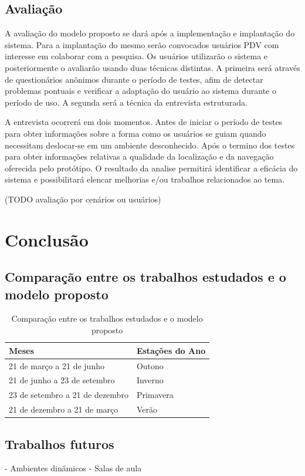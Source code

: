 \documentclass[english,brazilian]{UNISINOSmonografia}
\begin{document}
	\section{Avaliação}
A avaliação do modelo proposto se dará após a implementação e implantação do sistema. Para a implantação do mesmo serão convocados usuários PDV com interesse em colaborar com a pesquisa. Os usuários utilizarão o sistema e posteriormente o avaliarão usando duas técnicas distintas. A primeira será através de questionários anônimos durante o período de testes, afim de detectar problemas pontuais e verificar a adaptação do usuário ao sistema durante o período de uso. A segunda será a técnica da entrevista estruturada. 

A entrevista ocorrerá em dois momentos. Antes de iniciar o período de testes para obter informações sobre a forma como os usuários se guiam quando necessitam deslocar-se em um ambiente desconhecido. Após o termino dos testes para obter informações relativas a qualidade da localização e da navegação oferecida pelo protótipo. O resultado da analise permitirá identificar a eficácia do sistema e possibilitará elencar melhorias e/ou trabalhos relacionados ao tema.

(TODO avaliação por cenários ou usuários)

\chapter{Conclusão}

\section{Comparação entre os trabalhos estudados e o modelo proposto}

	\begin{table}
		\caption{Comparação entre os trabalhos estudados e o modelo proposto}
		\centering%
		\begin{minipage}{.6\textwidth}
			\begin{tabular*}{\textwidth}{ll}
				\hline
				\textbf{Meses} & \textbf{Estações do Ano}\\
				\hline
				21 de março a 21 de junho & Outono\\
				21 de junho a 23 de setembro & Inverno\\
				23 de setembro a 21 de dezembro & Primavera\\
				21 de dezembro a 21 de março & Verão\\
				\hline
			\end{tabular*}
		\end{minipage}
	\end{table}
	
	\section{Trabalhos futuros}
- Ambientes dinâmicos
- Salas de aula


\end{document}
